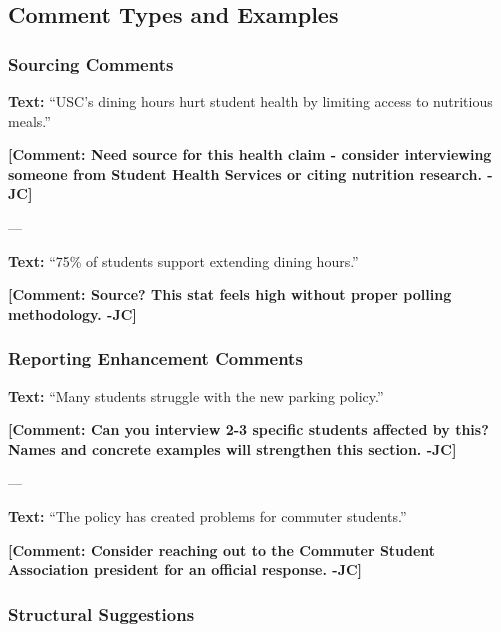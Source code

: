 \documentclass[12pt]{article}
\begin{document}
\newpage
\subsection{Comment Types and Examples}

\subsubsection{Sourcing Comments}

\begin{examplebox}
\textbf{Text:} ``USC's dining hours hurt student health by limiting access to nutritious meals.''

\textbf{\textcolor{atlantic}{[Comment: Need source for this health claim - consider interviewing someone from Student Health Services or citing nutrition research. -JC]}}
\end{examplebox}

---

\begin{examplebox}
\textbf{Text:} ``75\% of students support extending dining hours.''

\textbf{\textcolor{atlantic}{[Comment: Source? This stat feels high without proper polling methodology. -JC]}}
\end{examplebox}

\subsubsection{Reporting Enhancement Comments}

\begin{examplebox}
\textbf{Text:} ``Many students struggle with the new parking policy.''

\textbf{\textcolor{atlantic}{[Comment: Can you interview 2-3 specific students affected by this? Names and concrete examples will strengthen this section. -JC]}}
\end{examplebox}

---

\begin{examplebox}
\textbf{Text:} ``The policy has created problems for commuter students.''

\textbf{\textcolor{atlantic}{[Comment: Consider reaching out to the Commuter Student Association president for an official response. -JC]}}
\end{examplebox}

\subsubsection{Structural Suggestions}
\end{document}

